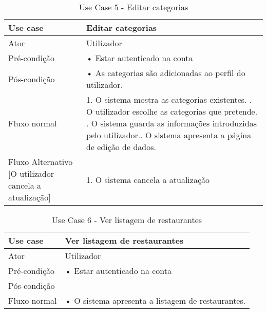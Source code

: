 \documentclass[a4paper,12pt]{scrreprt}
\begin{document}
   \begin{table}[htp]
      \begin{center}
        \begin{tabular}{ | m{10em} | m{11cm} | } 
          \hline
          Use case & Editar categorias \\ 
          \hline
          Ator & Utilizador \\ 
          \hline
          Pré-condição & 
          • Estar autenticado na conta  \\
          \hline
          Pós-condição &
          • As categorias são adicionadas ao perfil do utilizador. \\ 
          \hline
          Fluxo normal & 
          1. O sistema mostra as categorias existentes. \newline
          2. O utilizador escolhe as categorias que pretende. \newline
          3. O sistema guarda as informações introduzidas pelo utilizador.\newline
          4. O sistema apresenta a página de edição de dados.\\ 
          \hline 
            \cellcolor{yellow!65}
           Fluxo Alternativo [O utilizador cancela a atualização] &  
           1. O sistema cancela a atualização \\ 
           \hline
  \end{tabular}
\end{center} 
       \label{Tab: usecase5}
\caption{Use Case 5 - Editar categorias}
\end{table}
       
          \begin{table}[htp]
        \begin{center}
        \begin{tabular}{ | m{10em} | m{11cm} | } 
          \hline
          Use case & Ver listagem de restaurantes \\ 
          \hline
          Ator & Utilizador \\ 
          \hline
          Pré-condição & 
          • Estar autenticado na conta  \\
          \hline
          Pós-condição &  \\ 
          \hline
          Fluxo normal & 
          • O sistema apresenta a listagem de restaurantes. \\ 
          \hline 
  \end{tabular}
\end{center} 
\label{Tab: usecase6}
\caption{Use Case 6 - Ver listagem de restaurantes}
\end{table}
\end{document}
